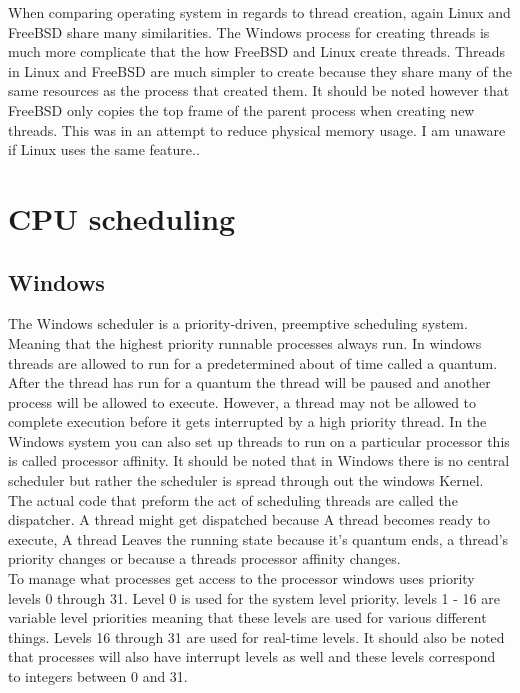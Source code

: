 \documentclass[letterpaper, onecolumn,10pt]{IEEEtran}
\begin{document}
			When comparing operating system in regards to thread creation, again Linux and FreeBSD share many similarities. The Windows process for creating threads is much more complicate that the how FreeBSD and Linux create threads. Threads in Linux and FreeBSD are much simpler to create because they share many of the same resources as the process that created them. It should be noted however that FreeBSD only copies the top frame of the parent process when creating new threads. This was in an attempt to reduce physical memory usage. I am unaware if Linux uses the same feature.\cite{Windows}\cite{Linux}\cite{FreeBSG}.\\
				
		
		\section{CPU scheduling}
			\subsection{Windows}
			The Windows scheduler is a priority-driven, preemptive scheduling system. Meaning that the highest priority runnable processes always run. In windows threads are allowed to run for a predetermined about of time called a quantum. After the thread has run for a quantum the thread will be paused and another process will be allowed to execute. However, a thread may not be allowed to complete execution before it gets interrupted by a high priority thread. In the Windows system you can also set up threads to run on a particular processor this is called processor affinity. It should be noted that in Windows there is no central scheduler but rather the scheduler is spread through out the windows Kernel. The actual code that preform the act of scheduling threads are called the dispatcher. A thread might get dispatched because A thread becomes ready to execute, A thread Leaves the running state because it's quantum ends, a thread's priority changes or because a threads processor affinity changes.\\
			To manage what processes get access to the processor windows uses priority levels 0 through 31. Level 0 is used for the system level priority. levels 1 - 16 are variable level priorities meaning that these levels are used for various different things. Levels 16 through 31 are used for real-time levels. It should also be noted that processes will also have interrupt levels as well and these levels correspond to integers between 0 and 31.\cite{Windows}\\
			
\end{document}
